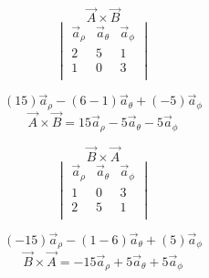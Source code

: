 \documentclass[14pt]{extarticle}
\begin{document}
\begin{multicols}{2}
	\begin{center}
		$$\vec{A}\times\vec{B}$$
		\[
			\begin{vmatrix}
				\vec{a}_\rho & \vec{a}_\theta & \vec{a}_\phi \\
				2            & 5              & 1            \\
				1            & 0              & 3            \\
			\end{vmatrix}
		\]

		$$(15)\vec{a}_\rho-(6-1)\vec{a}_\theta+(-5)\vec{a}_\phi$$
		$$\vec{A}\times\vec{B}=15\vec{a}_\rho-5\vec{a}_\theta-5\vec{a}_\phi$$
	\end{center}
	\begin{center}
		$$\vec{B}\times\vec{A}$$
		\[
			\begin{vmatrix}
				\vec{a}_\rho & \vec{a}_\theta & \vec{a}_\phi \\
				1            & 0              & 3            \\
				2            & 5              & 1            \\
			\end{vmatrix}
		\]

		$$(-15)\vec{a}_\rho-(1-6)\vec{a}_\theta+(5)\vec{a}_\phi$$
		$$\vec{B}\times\vec{A}=-15\vec{a}_\rho+5\vec{a}_\theta+5\vec{a}_\phi$$
	\end{center}
\end{multicols}
\end{document}
